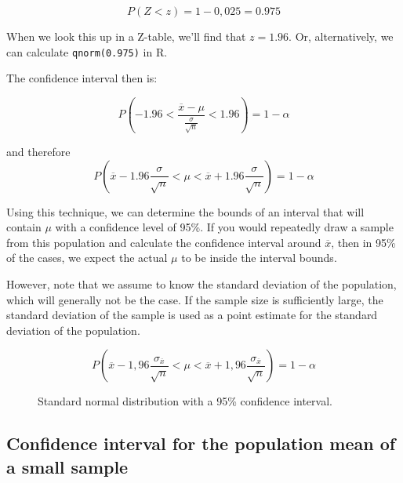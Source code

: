 \[ P( Z < z) = 1 - 0,025 = 0.975 \]

When we look this up in a Z-table, we'll find that $z = 1.96$. Or, alternatively, we can calculate \verb|qnorm(0.975)| in R.

The confidence interval then is:

\[ P( -1.96 < \frac{\overline{x} - \mu}{\frac{\sigma}{\sqrt{n}}} < 1.96 ) = 1 - \alpha\]

and therefore
\[ P ( \overline{x} -1.96 \frac{\sigma}{\sqrt{n}} <\mu < \overline{x} + 1.96 \frac{\sigma}{\sqrt{n}}) = 1 - \alpha \]

Using this technique, we can determine the bounds of an interval that will contain $\mu$ with a confidence level of 95\%. 
If you would repeatedly draw a sample from this population and calculate the confidence interval around $\overline{x}$, then in 95\% of the cases, we expect the actual $\mu$ to be inside the interval bounds.

However, note that we assume to know the standard deviation of the population, which will generally not be the case. If the sample size is sufficiently large, the standard deviation of the sample is used as a point estimate for the standard deviation of the population.

\[ P ( \overline{x} -1,96 \frac{\sigma_{\overline{x}}}{\sqrt{n}} < \mu < \overline{x} + 1,96 \frac{\sigma_{\overline{x}}}{\sqrt{n}}) = 1 - \alpha \]


\begin{figure}
\centering
{}
\caption{Standard normal distribution with a 95\% confidence interval.}
\label{fig:verdelingStandaardnormaal}
\end{figure}

\subsection{Confidence interval for the population mean of a small sample}
\label{ssec:confidence-interval-pop-mean-small-sample}

